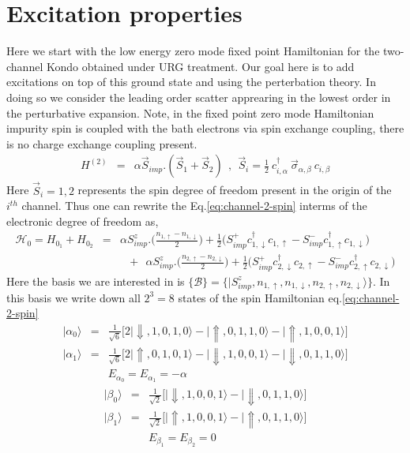 \documentclass[reprint,prb,superscriptaddress]{revtex4-1}
\begin{document}
\section{Excitation properties}
Here we start with the low energy zero mode fixed point Hamiltonian for the two-channel Kondo obtained under URG treatment. Our goal here is to add excitations on top of this ground state and using the perterbation theory. In doing so we consider the leading order scatter apprearing in the lowest order in the perturbative expansion. Note, in the fixed point zero mode Hamiltonian impurity spin is coupled with the bath electrons via spin exchange coupling, there is no charge exchange coupling present. 
\begin{eqnarray}
H^{(2)}&=& \alpha \vec{S}_{imp}.(\vec{S}_1+\vec{S}_2)~~,~~\vec{S}_i =  \frac{1}{2}~ c_{i,\alpha}^{\dagger}~ \vec{\sigma}_{\alpha,\beta}~ c_{i,\beta}
\label{eq:channel-2-spin}
\end{eqnarray}
Here $\vec{S}_i=1,2$ represents the spin degree of freedom present in the origin of the $i^{th}$ channel. Thus one can rewrite the Eq.\eqref{eq:channel-2-spin} interms of the electronic degree of freedom as,
\begin{eqnarray}
\mathcal{H}_0= H_{0_1}+H_{0_2} &=& \alpha S^z_{imp}.\bigg(\frac{n_{1,\uparrow}-n_{1,\downarrow}}{2} \bigg) + \frac{1}{2} \bigg( S_{imp}^{+} c^{\dagger}_{1,\downarrow} c_{1,\uparrow} - S_{imp}^{-} c_{1,\uparrow}^{\dagger} c_{1,\downarrow} \bigg)\nonumber\\
&& ~~~+~~ \alpha S^z_{imp}.\bigg(\frac{n_{2,\uparrow}-n_{2,\downarrow}}{2} \bigg) + \frac{1}{2} \bigg( S_{imp}^{+} c^{\dagger}_{2,\downarrow} c_{2,\uparrow} - S_{imp}^{-} c_{2,\uparrow}^{\dagger} c_{2,\downarrow} \bigg)
\end{eqnarray}
Here the basis we are interested in is $\{\mathcal{B}\}=\{|S^z_{imp},n_{1,\uparrow},n_{1,\downarrow},n_{2,\uparrow},n_{2,\downarrow}\rangle \}$. In this basis we write down all $2^3=8$ states of the spin Hamiltonian eq.\eqref{eq:channel-2-spin}
\begin{eqnarray}
|\alpha_0\rangle &=& \frac{1}{\sqrt{6}} \bigg[2|\Downarrow,1,0,1,0\rangle-|\Uparrow,0,1,1,0\rangle-|\Uparrow,1,0,0,1\rangle\bigg] \nonumber\\
|\alpha_1\rangle &=& \frac{1}{\sqrt{6}} \bigg[2|\Uparrow,0,1,0,1\rangle-|\Downarrow,1,0,0,1\rangle-|\Downarrow,0,1,1,0\rangle\bigg] \nonumber\\
&& E_{\alpha_0}= E_{\alpha_1}= -\alpha
\end{eqnarray}
\begin{eqnarray}
|\beta_0\rangle &=& \frac{1}{\sqrt{2}}\bigg[|\Downarrow,1,0,0,1\rangle-|\Downarrow,0,1,1,0\rangle \bigg] \nonumber\\
|\beta_1\rangle &=& \frac{1}{\sqrt{2}} \bigg[ |\Uparrow,1,0,0,1\rangle-|\Uparrow,0,1,1,0\rangle \bigg]\nonumber\\
&& E_{\beta_1}=E_{\beta_2}=0
\end{eqnarray}
\end{document}
